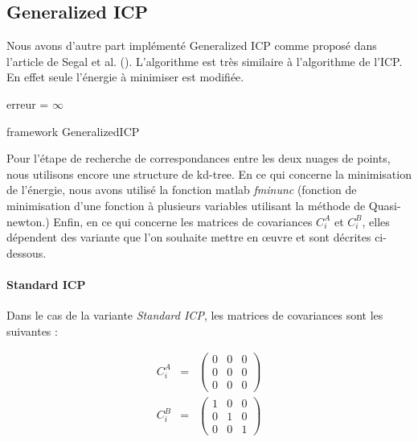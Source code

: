 \subsection{Generalized ICP}
\label{part:impl_gicp}
Nous avons d'autre part implémenté Generalized ICP comme proposé dans l'article de Segal et al. (\cite{bib_gicp}). L'algorithme est très similaire à l'algorithme de l'ICP. En effet seule l'énergie à minimiser est modifiée.\\

\begin{algorithm}[H]
erreur = $\infty$\;
\caption{framework GeneralizedICP}
\label{algo_gicp}
\end{algorithm}

Pour l'étape de recherche de correspondances entre les deux nuages de points, nous utilisons encore une structure de kd-tree. 
En ce qui concerne la minimisation de l'énergie, nous avons utilisé la fonction matlab \textit{fminunc} (fonction de minimisation d'une fonction à plusieurs variables utilisant la méthode de Quasi-newton.)
Enfin, en ce qui concerne les matrices de covariances $C_{i}^{A}$ et $C_{i}^{B}$, elles dépendent des variante que l'on souhaite mettre en œuvre et sont décrites ci-dessous.

\paragraph{Standard ICP}
Dans le cas de la variante \textit{Standard ICP}, les matrices de covariances sont les suivantes :

\begin{eqnarray}
C_{i}^A &=& 
\begin{pmatrix}
0 & 0 & 0\\
0 & 0 & 0\\
0 & 0 & 0
\end{pmatrix}\\
C_{i}^B &=& 
\begin{pmatrix}
1 & 0 & 0\\
0 & 1 & 0\\
0 & 0 & 1
\end{pmatrix}
\end{eqnarray}

